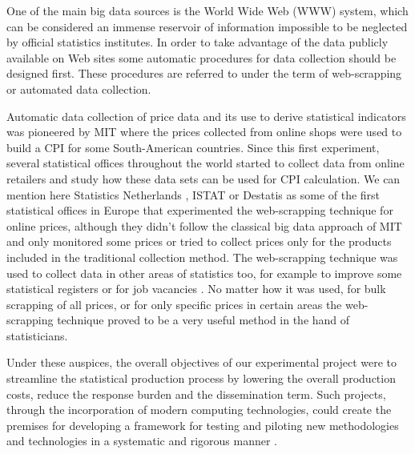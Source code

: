 \documentclass[]{article}
\begin{document}
One of the main big data sources is the World Wide Web (WWW) system, which can be considered an immense reservoir of information impossible to be neglected
by official statistics institutes. In order to take advantage of the data publicly available on Web sites some automatic procedures for data collection 
should be designed first. These procedures are referred to under the term of web-scrapping or automated data collection.

Automatic data collection of price data and its use to derive statistical indicators was pioneered by MIT \cite{MIT} where the prices collected 
from online shops were used to build a CPI for some South-American countries. Since this first experiment, several
statistical offices throughout the world started to collect data from online retailers and study how these data sets can be used
for CPI calculation. We can mention here Statistics Netherlands \cite{cbs}, ISTAT \cite{polidoro}  
or Destatis \cite{bruner} as some of the first statistical offices in Europe that experimented the web-scrapping technique for online prices, 
although they didn't follow the classical big data approach of MIT and only monitored some prices or tried to collect prices
only for the products included in the traditional collection method. The web-scrapping technique was used to collect data in other areas
of statistics too, for example to improve some statistical registers \cite{barcoli} or for job vacancies \cite{swier2}.
No matter how it was used, for bulk scrapping of all prices, or for only specific prices in certain areas \cite{cbs2} the web-scrapping technique 
proved to be a very useful method in the hand of statisticians.


Under these auspices, the overall objectives of our experimental project were to streamline the statistical production process by 
lowering the overall production costs, reduce the response burden and the dissemination term. Such projects, through the incorporation 
of modern computing technologies, could create the premises for developing a framework for testing and piloting new methodologies 
and technologies in a systematic and rigorous manner \cite{ons2017}. 
\end{document}
